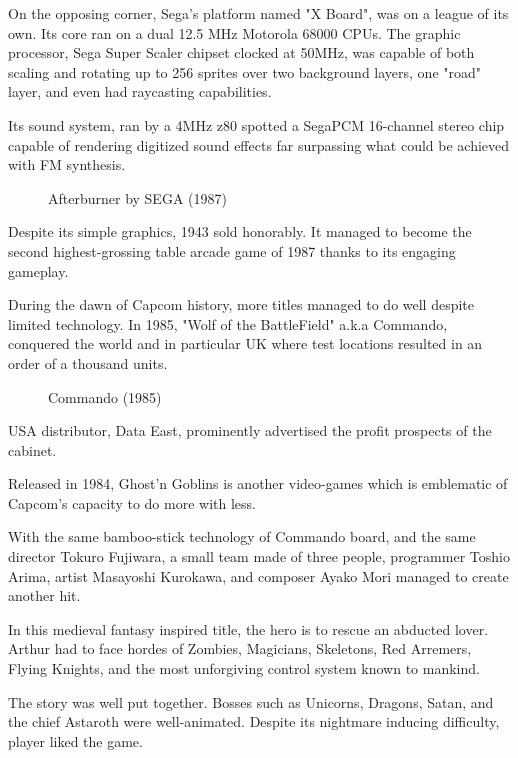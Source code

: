 On the opposing corner, Sega's platform named "X Board", was on a league of its own. Its core ran on a dual 12.5 MHz Motorola 68000 CPUs. The graphic processor, Sega Super Scaler chipset clocked at 50MHz, was capable of both scaling and rotating up to 256 sprites over two background layers, one "road" layer, and even had raycasting capabilities. 

Its sound system, ran by a 4MHz z80 spotted a SegaPCM 16-channel stereo chip capable of rendering digitized sound effects far surpassing what could be achieved with FM synthesis.



\begin{figure}[H]
\caption*{Afterburner by SEGA (1987)}
\end{figure}

Despite its simple graphics, 1943 sold honorably. It managed to become the second highest-grossing table arcade game of 1987 thanks to its engaging gameplay. 

During the dawn of Capcom history, more titles managed to do well despite limited technology. In 1985, "Wolf of the BattleField" a.k.a Commando, conquered the world and in particular UK where test locations resulted in an order of a thousand units.

\begin{figure}[H]
\caption*{Commando (1985)}
\end{figure}

USA distributor, Data East, prominently advertised the profit prospects of the cabinet.
\vfill



Released in 1984, Ghost’n Goblins is another video-games which is emblematic of Capcom's capacity to do more with less. 

With the same bamboo-stick technology of Commando board, and the same director Tokuro Fujiwara, a small team made of three people, programmer Toshio Arima, artist Masayoshi Kurokawa, and composer Ayako Mori managed to create another hit.

In this medieval fantasy inspired title, the hero is to rescue an abducted lover. Arthur had to face hordes of Zombies, Magicians, Skeletons, Red Arremers, Flying Knights, and the most unforgiving control system known to mankind.

The story was well put together. Bosses such as Unicorns, Dragons, Satan, and the chief Astaroth were well-animated. Despite its nightmare inducing difficulty, player liked the game. 

